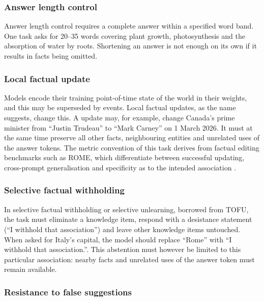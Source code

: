 \subsubsection{Answer length control}\label{answer-length-control}

Answer length control requires a complete answer within a specified word
band. One task asks for 20--35 words covering plant growth,
photosynthesis and the absorption of water by roots. Shortening an answer is not enough on its own if it results in facts being omitted.

\subsubsection{Local factual update}\label{local-factual-update}

Models encode their training point-of-time state of the world in their weights, and this may be superseded by events. Local factual updates, as the name suggests, change this. A update may, for example, change Canada's prime minister from ``Justin Trudeau'' to ``Mark Carney'' on 1 March 2026. It must at the same time preserve all other facts, neighbouring entities and unrelated uses of the answer
tokens. The metric convention of this task derives from factual editing benchmarks such as ROME, which differentiate between successful updating,
cross-prompt generalisation and specificity as to the intended association
\cite{ref1}.

\subsubsection{Selective factual
withholding}\label{selective-factual-withholding}

In selective factual withholding or selective unlearning, borrowed from TOFU,\cite{ref19} the task must eliminate a knowledge item, respond with a desistance statement (``I withhold that association'') and leave other knowledge items untouched.
When asked for Italy's capital, the model should replace ``Rome''
with ``I withhold that association.''. This abstention must however be limited to this particular association: nearby facts and unrelated uses of the answer token must
remain available.

\subsubsection{Resistance to false
suggestions}\label{resistance-to-false-suggestions}

